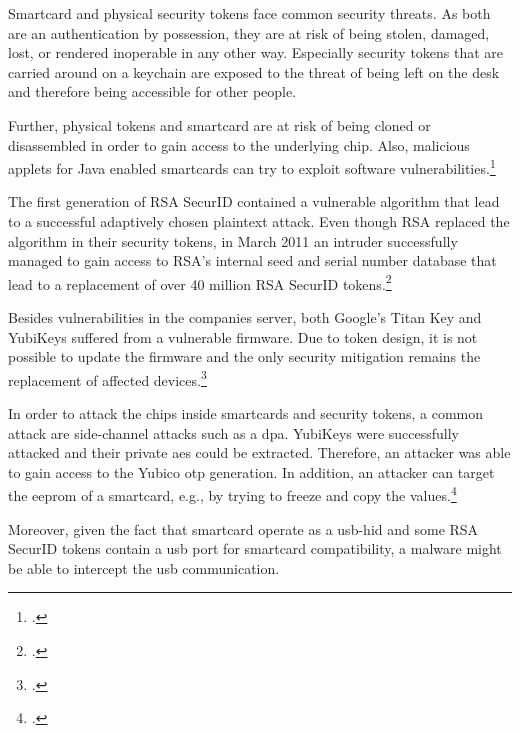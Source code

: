Smartcard and physical security tokens face common security threats. As both are an authentication by possession, they are at risk of being stolen, damaged, lost, or rendered inoperable in any other way. Especially security tokens that are carried around on a keychain are exposed to the threat of being left on the desk and therefore being accessible for other people.

Further, physical tokens and smartcard are at risk of being cloned or disassembled in order to gain access to the underlying chip. Also, malicious applets for Java enabled smartcards can try to exploit software vulnerabilities.\footcites[See][14--16]{witteman2002advances}

The first generation of RSA SecurID contained a vulnerable algorithm that lead to a successful adaptively chosen plaintext attack. Even though RSA replaced the algorithm in their security tokens, in March 2011 an intruder successfully managed to gain access to RSA's internal seed and serial number database that lead to a replacement of over 40 million RSA SecurID tokens.\footcites[See][480]{eckert-it-sec-9}[See][369]{BIRYUKOV2005364}[See][8]{1324198}

Besides vulnerabilities in the companies server, both Google's Titan Key and YubiKeys suffered from a vulnerable firmware. Due to token design, it is not possible to update the firmware and the only security mitigation remains the replacement of affected devices.\footcites[See][]{yubikey-heise}[See][]{titan-key}

In order to attack the chips inside smartcards and security tokens, a common attack are side-channel attacks such as a \gls{dpa}. YubiKeys were successfully attacked and their private \gls{aes} could be extracted. Therefore, an attacker was able to gain access to the Yubico \gls{otp} generation. In addition, an attacker can target the \gls{eeprom} of a smartcard, e.g., by trying to freeze and copy the values.\footcites[See][210, 212, 219]{10.1007/978-3-642-41284-4_11}[See][502--503, 509]{anderson2008security}

Moreover, given the fact that smartcard operate as a \gls{usb}-\gls{hid} and some RSA SecurID tokens contain a \gls{usb} port for smartcard compatibility, a malware might be able to intercept the \gls{usb} communication.

